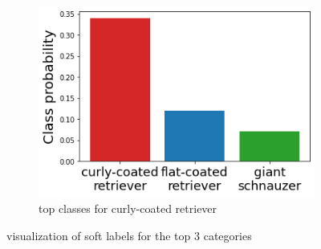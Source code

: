 \documentclass[10pt,twocolumn,letterpaper]{article}
\begin{document}
\begin{figure}
\begin{subfigure}[t]{0.4\linewidth}
        \includegraphics[width=\textwidth]{images/retriever.png}
        \caption*{top classes for curly-coated retriever}
    \end{subfigure}
    \caption{visualization of soft labels for the top 3 categories}
    \label{fig.appendix.soft_label}
\end{figure}

\begin{table}
\begin{center}
\end{center}
\caption{Peak memory usage comparison on CIFAR-100 between MTT and ours using batch size 100. The units are in MB. \textit{Matching step} means how many gradient descent steps to run before performing model training trajectory matching.}
\label{tab:cost}
\end{table}
\end{document}

